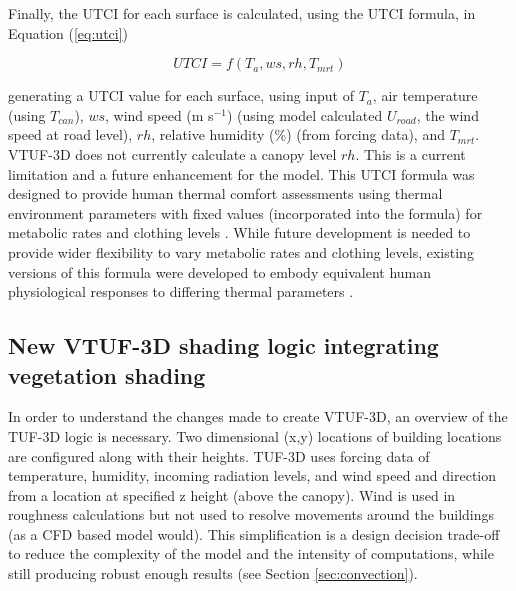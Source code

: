 \documentclass[final,3p,times,authoryear]{elsarticle}
\begin{document}
Finally, the UTCI for each surface is calculated, using the \cite{Brode2009u} UTCI formula, in Equation (\ref{eq:utci})

\begin{equation}\label{eq:utci}
  UTCI = f(T_{a}, ws, rh, T_{mrt})
\end{equation}

generating a UTCI value for each surface, using input of $T_{a}$, air temperature (using $T_{can}$), $ws$, wind speed (m s$^{-1}$) (using model calculated $U_{road}$, the wind speed at road level), $rh$, relative humidity (\%) (from forcing data), and $T_{mrt}$. VTUF-3D does not currently calculate a canopy level $rh$. This is a current limitation and a future enhancement for the model. This UTCI formula was designed to provide human thermal comfort assessments using thermal environment parameters with fixed values (incorporated into the formula) for metabolic rates and clothing levels \citep{Brode2012a}. While future development is needed to provide wider flexibility to vary metabolic rates and clothing levels, existing versions of this formula were developed to embody equivalent human physiological responses to differing thermal parameters \citep{Havenith2012,Fiala2012}.

\subsection{New VTUF-3D shading logic integrating vegetation shading}\label{sec:integration}
In order to understand the changes made to create VTUF-3D, an overview of the TUF-3D logic is necessary. Two dimensional (x,y) locations of building locations are configured along with their heights. TUF-3D uses forcing data of temperature, humidity, incoming radiation levels, and wind speed and direction from a location at specified z height (above the canopy). Wind is used in roughness calculations but not used to resolve movements around the buildings (as a CFD based model would). This simplification is a design decision trade-off to reduce the complexity of the model and the intensity of computations, while still producing robust enough results (see Section \ref{sec:convection}).
\end{document}
